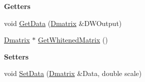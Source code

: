 \begin{Indent}\textbf{ Getters}\par
\begin{DoxyCompactItemize}
\item 
void \hyperlink{classtsa_1_1_double_whitening_abd1b553bad47599218970e1528b6c66a}{Get\+Data} (\hyperlink{namespacetsa_ad260cd21c1891c4ed391fe788569aba4}{Dmatrix} \&D\+W\+Output)
\item 
\hyperlink{namespacetsa_ad260cd21c1891c4ed391fe788569aba4}{Dmatrix} $\ast$ \hyperlink{classtsa_1_1_double_whitening_ad7fb8efabf5bc439b4d1a8aaa9ef86ea}{Get\+Whitened\+Matrix} ()
\end{DoxyCompactItemize}
\end{Indent}
\begin{Indent}\textbf{ Setters}\par
\begin{DoxyCompactItemize}
\item 
void \hyperlink{classtsa_1_1_double_whitening_a0b4972ef97afa13544eb713749d891ae}{Set\+Data} (\hyperlink{namespacetsa_ad260cd21c1891c4ed391fe788569aba4}{Dmatrix} \&Data, double scale)
\end{DoxyCompactItemize}
\end{Indent}
